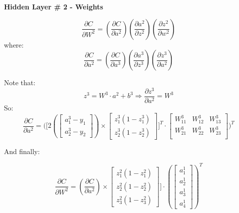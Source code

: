\documentclass[12pt]{article}
\begin{document}
\textbf{Hidden Layer \# 2 - Weights}

\begin{equation}
    \dfrac{\partial C}{\partial W^{2}} = \left(\dfrac{\partial C}{\partial a^{2}}\right)\left( \dfrac{\partial a^{2}}{\partial z^{2}}\right) \left( \dfrac{\partial z^{2}}{\partial w^{2}}\right)
\end{equation}
where:
\begin{equation}
     \dfrac{\partial C}{\partial a^{2}} = \left( \dfrac{\partial C}{\partial a^{3}}\right) \left( \dfrac{\partial a^{3}}{\partial z^{3}}\right) \left(\dfrac{\partial z^{3}}{\partial a^{2}} \right)
\end{equation}

Note that:
\[
z^{3} = W^{3}\cdot a^{2} + b^{3} \Rightarrow \dfrac{\partial z^{3}}{\partial a^{2}} = W^{3}
\] 
So:
\begin{equation}
 \dfrac{\partial C}{\partial a^{2}}
=\Bigg(
\Bigg[
2\left(
\begin{bmatrix}
a_{1}^{3} - y_{1}\\
a_{2}^{3} - y_{2}
\end{bmatrix}
\right)
\times
\begin{bmatrix}
z_{1}^{3} ( 1 - z_{1}^{3} )\\
z_{2}^{3} ( 1 - z_{2}^{3})
\end{bmatrix}
\Bigg]^{T}
\cdot
\begin{bmatrix}
W_{11}^{3} & W_{12}^{3} & W_{13}^{3} \\
W_{21}^{3} & W_{22}^{3} & W_{23}^{3} \\ 
\end{bmatrix}
\Bigg)^{T}
\end{equation}

And finally:

\begin{equation}
\dfrac{\partial C}{\partial W^{2}} = \left(\dfrac{\partial C}{\partial a^{2}}\right)
\times
\begin{bmatrix}
z_{1}^{2} ( 1 - z_{1}^{2} )\\
z_{2}^{2} ( 1 - z_{2}^{2}) \\
z_{3}^{2} ( 1 - z_{3}^{2}) 
\end{bmatrix}
\Bigg]
\cdot
\left(
\begin{bmatrix}
a_{1}^{1}\\
a_{2}^{1}\\
a_{3}^{1}\\
a_{4}^{1}
\end{bmatrix}
\right)^{T}
\end{equation} \mbox{} \\
\end{document}
